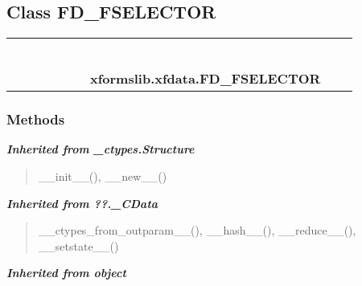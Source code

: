 \subsection{Class FD\_FSELECTOR}

    \label{xformslib:xfdata:FD_FSELECTOR}
\begin{tabular}{cccccccccc}
\multicolumn{2}{r}{\settowidth{\BCL}{object}\multirow{2}{\BCL}{object}}
&&
&&
&&
  \\\cline{3-3}
  &&\multicolumn{1}{c|}{}
&&
&&
&&
  \\
\multicolumn{4}{r}{\settowidth{\BCL}{??.\_CData}\multirow{2}{\BCL}{??.\_CData}}
&&
&&
  \\\cline{5-5}
  &&&&\multicolumn{1}{c|}{}
&&
&&
  \\
\multicolumn{6}{r}{\settowidth{\BCL}{\_ctypes.Structure}\multirow{2}{\BCL}{\_ctypes.Structure}}
&&
  \\\cline{7-7}
  &&&&&&\multicolumn{1}{c|}{}
&&
  \\
&&&&&&\multicolumn{2}{l}{\textbf{xformslib.xfdata.FD\_FSELECTOR}}
\end{tabular}



  \subsubsection{Methods}


\large{\textbf{\textit{Inherited from \_ctypes.Structure}}}

\begin{quote}
\_\_init\_\_(), \_\_new\_\_()
\end{quote}

\large{\textbf{\textit{Inherited from ??.\_CData}}}

\begin{quote}
\_\_ctypes\_from\_outparam\_\_(), \_\_hash\_\_(), \_\_reduce\_\_(), \_\_setstate\_\_()
\end{quote}

\large{\textbf{\textit{Inherited from object}}}

